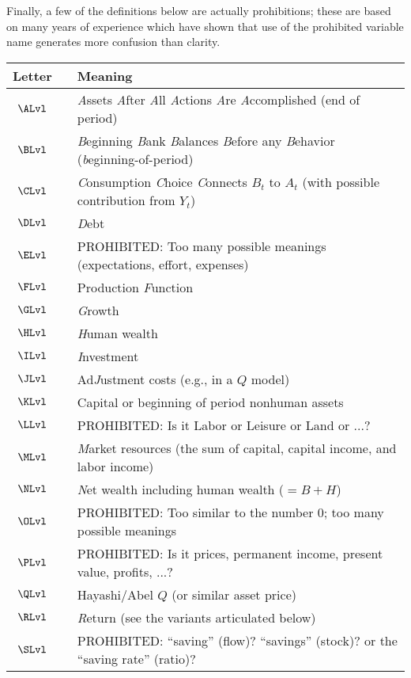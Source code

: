 \documentclass[12pt]{\econtex}
\begin{document}
Finally, a few of the definitions below are actually prohibitions; these are based on many years of experience which have shown that use of the prohibited variable name generates more confusion than clarity.  

\hypertarget{RomanLetters}{}
\begin{table}[ht]
  \centering
  \begin{tabular}{|ccl|}   \hline
    Letter & & Meaning 
    \\ \hline
$    \ALvl$ & & \textit{A}ssets \textit{A}fter \textit{A}ll \textit{A}ctions \textit{A}re \textit{A}ccomplished (end of period)
    \\ $ \BLvl$ & & \textit{B}eginning \textit{B}ank \textit{B}alances \textit{B}efore any \textit{B}ehavior (\textit{b}eginning-of-period)
    \\ $ \CLvl$ & & \textit{C}onsumption \textit{C}hoice \textit{C}onnects $B_{t}$ to $A_{t}$ (with possible contribution from $Y_{t}$)
    \\ $ \DLvl$ & & \textit{D}ebt
    \\ $ \ELvl$ & & PROHIBITED:  Too many possible meanings (expectations, effort, expenses)
    \\ $ \FLvl$ & & Production \textit{F}unction
    \\ $ \GLvl$ & & \textit{G}rowth 
    \\ $ \HLvl$ & & \textit{H}uman wealth
    \\ $ \ILvl$ & & \textit{I}nvestment
    \\ $ \JLvl$ & & Ad\textit{J}ustment costs (e.g., in a $Q$ model)
    \\ $ \KLvl$ & & Capital or beginning of period nonhuman assets
    \\ $ \LLvl$ & & PROHIBITED: Is it Labor or Leisure or Land or ...?
    \\ $ \MLvl$ & & \textit{M}arket resources (the sum of capital, capital income, and labor income)
    \\ $ \NLvl$ & & \textit{N}et wealth including human wealth ($=B + H$)
    \\ $ \OLvl$ & & PROHIBITED: Too similar to the number 0; too many possible meanings
    \\ $ \PLvl$ & & PROHIBITED: Is it prices, permanent income, present value, profits, ...?
    \\ $ \QLvl$ & & Hayashi/Abel $Q$ (or similar asset price)
    \\ $ \RLvl$ & & \textit{R}eturn (see the variants articulated below)
    \\ $ \SLvl$ & & PROHIBITED: ``saving'' (flow)? ``savings'' (stock)? or the ``saving rate'' (ratio)?

\end{tabular}
\end{table}
\end{document}
